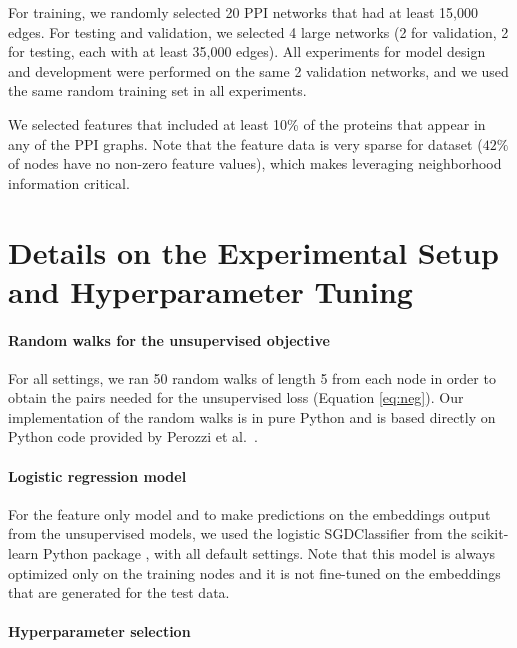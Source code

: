 For training, we randomly selected 20 PPI networks that had at least 15,000 edges. For testing and validation, we selected 4 large networks (2 for validation, 2 for testing, each with at least 35,000 edges). All experiments for model design and development were performed on the same 2 validation networks, and we used the same random training set in all experiments.

We selected features that included at least 10\% of the proteins that appear in any of the PPI graphs. 
Note that the feature data is very sparse for dataset ($42\%$ of nodes have no non-zero feature values), which makes leveraging neighborhood information critical. 

\section{Details on the Experimental Setup and Hyperparameter Tuning}\label{sec:hyper}

\paragraph{Random walks for the unsupervised objective}
For all settings, we ran 50 random walks of length 5 from each node in order to obtain the pairs needed for the unsupervised loss (Equation \ref{eq:neg}).
Our implementation of the random walks is in pure Python and is based directly on Python code provided by Perozzi et al.~\cite{perozzi2014deepwalk}.

\paragraph{Logistic regression model}
For the feature only model and to make predictions on the embeddings output from the unsupervised models, 
we used the logistic SGDClassifier from the scikit-learn Python package \cite{scikit-learn}, with all default settings.
Note that this model is always optimized only on the training nodes and it is not fine-tuned on the embeddings that are generated for the test data.


\paragraph{Hyperparameter selection}


